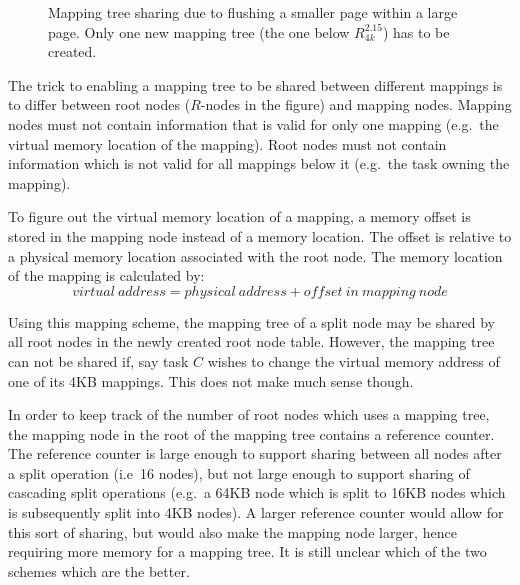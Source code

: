 \documentclass[a4paper,10pt,twoside]{article}
\begin{document}
\begin{figure}[tbp]
  \begin{center}
    \label{fig:mapsshare-1}%
    \hspace{1cm}%
    \label{fig:mapshare-2}%
    \caption{Mapping tree sharing due to flushing a smaller page
      within a large page.  Only one new mapping tree (the one below
      $R^{2.15}_{4k}$) has to be created.}
    \label{fig:mapshare}
  \end{center}
\end{figure}

The trick to enabling a mapping tree to be shared between different
mappings is to differ between root nodes ($R$-nodes in the figure) and
mapping nodes.  Mapping nodes must not contain information that is
valid for only one mapping (e.g.\ the virtual memory location of the
mapping).  Root nodes must not contain information which is not valid
for all mappings below it (e.g.\ the task owning the mapping).

To figure out the virtual memory location of a mapping, a memory
offset is stored in the mapping node instead of a memory location.
The offset is relative to a physical memory location associated with
the root node.  The memory location of the mapping is calculated by:
\[
virtual\ address = physical\ address + offset\ in\ mapping\ node
\]

Using this mapping scheme, the mapping tree of a split node may be
shared by all root nodes in the newly created root node table.
However, the mapping tree can not be shared if, say task $C$ wishes to
change the virtual memory address of one of its 4KB mappings.  This
does not make much sense though.

In order to keep track of the number of root nodes which uses a
mapping tree, the mapping node in the root of the mapping tree
contains a reference counter.  The reference counter is large enough
to support sharing between all nodes after a split operation (i.e\ 16
nodes), but not large enough to support sharing of cascading split
operations (e.g.\ a 64KB node which is split to 16KB nodes which is
subsequently split into 4KB nodes).  A larger reference counter would
allow for this sort of sharing, but would also make the mapping node
larger, hence requiring more memory for a mapping tree.  It is still
unclear which of the two schemes which are the better.
\end{document}
